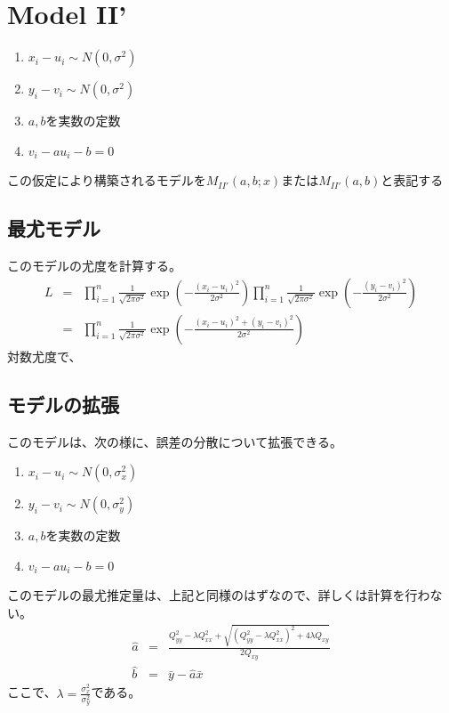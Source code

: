 \section{Model II'}

\begin{enumerate}
 \item $x_i-u_i \sim N(0,\sigma^2)$
 \item $y_i-v_i \sim N(0,\sigma^2)$
 \item $a,b$を実数の定数
 \item $v_i -a u_i -b = 0$
\end{enumerate}
この仮定により構築されるモデルを$M_{II'}(a,b; x)$または$M_{II'}(a,b)$と表記する

\subsection{最尤モデル}
このモデルの尤度を計算する。
\begin{eqnarray*}
 L &=& \prod_{i=1}^{n}\frac{1}{\sqrt{2\pi\sigma^2}}\exp\left(-\frac{(x_i-u_i)^2}{2\sigma^2} \right)\prod_{i=1}^{n}\frac{1}{\sqrt{2\pi\sigma^2}}\exp\left(-\frac{(y_i-v_i)^2}{2\sigma^2} \right)\\
 &=& \prod_{i=1}^{n}\frac{1}{\sqrt{2\pi\sigma^2}}\exp\left(-\frac{(x_i-u_i)^2+(y_i-v_i)^2}{2\sigma^2} \right)
\end{eqnarray*}
対数尤度で、

\subsection{モデルの拡張}
このモデルは、次の様に、誤差の分散について拡張できる。
\begin{enumerate}
 \item $x_i-u_i \sim N(0,\sigma_x^2)$
 \item $y_i-v_i \sim N(0,\sigma_y^2)$
 \item $a,b$を実数の定数
 \item $v_i -a u_i -b = 0$
\end{enumerate}
このモデルの最尤推定量は、上記と同様のはずなので、詳しくは計算を行わない。
\begin{eqnarray*}
 \hat{a} &=& \frac{Q^2_{yy}-\lambda Q^2_{xx}+\sqrt{(Q^2_{yy}-\lambda Q^2_{xx})^2+4\lambda Q_{xy}}}{2Q_{xy}} \\
 \hat{b} &=& \bar{y}-\hat{a}\bar{x}
\end{eqnarray*}
ここで、$\lambda = \frac{\sigma_x^2}{\sigma_y^2}$である。


\fi




